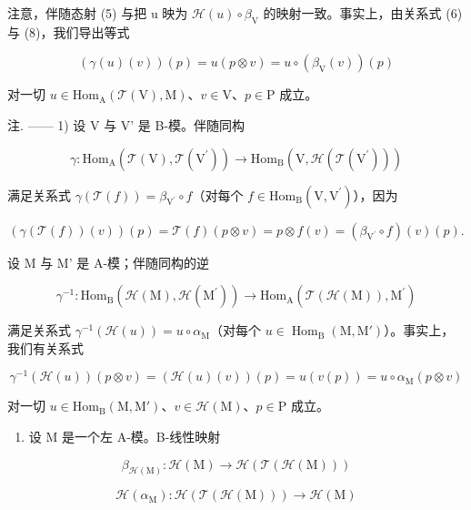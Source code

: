 注意，伴随态射 (5) 与把 u 映为 \(\mathcal{H}(u)\circ\beta_{\mathrm{V}}\) 的映射一致。事实上，由关系式 (6) 与 (8)，我们导出等式

\[
(\gamma (u) (v)) (p) = u (p \otimes v) = u \circ (\beta_ {\mathrm{V}} (v)) (p)
\]

对一切 \(u \in \mathrm{Hom}_{\mathrm{A}}(\mathcal{T}(\mathrm{V}), \mathrm{M})\)、\(v \in \mathrm{V}\)、\(p \in \mathrm{P}\) 成立。

注. —— 1) 设 V 与 V' 是 B-模。伴随同构

\[
\gamma : \mathrm{Hom} _ {\mathrm{A}} (\mathcal {T} (\mathrm{V}), \mathcal {T} (\mathrm{V} ^ {\prime})) \longrightarrow \mathrm{Hom} _ {\mathrm{B}} (\mathrm{V}, \mathcal {H} (\mathcal {T} (\mathrm{V} ^ {\prime})))
\]

满足关系式 \(\gamma (\mathcal{T}(f)) = \beta_{\mathrm{V}^{\prime}}\circ f\)（对每个 \(f\in \mathrm{Hom}_{\mathrm{B}}(\mathrm{V},\mathrm{V}^{\prime})\)），因为

\[
(\gamma (\mathcal {T} (f)) (v)) (p) = \mathcal {T} (f) (p \otimes v) = p \otimes f (v) = (\beta_ {\mathrm{V} ^ {\prime}} \circ f) (v) (p).
\]

设 M 与 M' 是 A-模；伴随同构的逆

\[
\gamma^ {- 1}: \mathrm{Hom} _ {\mathrm{B}} (\mathcal {H} (\mathrm{M}), \mathcal {H} (\mathrm{M} ^ {\prime})) \longrightarrow \mathrm{Hom} _ {\mathrm{A}} (\mathcal {T} (\mathcal {H} (\mathrm{M})), \mathrm{M} ^ {\prime})
\]

满足关系式 \(\gamma^{-1}(\mathcal{H}(u)) = u \circ \alpha_{\mathrm{M}}\)（对每个 \(u \in \operatorname{Hom}_{\mathrm{B}}(\mathrm{M}, \mathrm{M}')\)）。事实上，我们有关系式

\[
\gamma^ {- 1} (\mathcal {H} (u)) (p \otimes v) = (\mathcal {H} (u) (v)) (p) = u (v (p)) = u \circ \alpha_ {\mathrm{M}} (p \otimes v)
\]

对一切 \(u \in \mathrm{Hom}_{\mathrm{B}}(\mathrm{M}, \mathrm{M}')\)、\(v \in \mathcal{H}(\mathrm{M})\)、\(p \in \mathrm{P}\) 成立。

\begin{enumerate}
\def\labelenumi{\arabic{enumi})}
\setcounter{enumi}{1}
\tightlist
\item
  设 \(\mathrm{M}\) 是一个左 A-模。B-线性映射
\end{enumerate}

\[
\beta_ {\mathcal {H} (\mathrm{M})}: \mathcal {H} (\mathrm{M}) \to \mathcal {H} (\mathcal {T} (\mathcal {H} (\mathrm{M})))
\]

\[
\mathcal {H} (\alpha_ {\mathrm{M}}): \mathcal {H} (\mathcal {T} (\mathcal {H} (\mathrm{M}))) \to \mathcal {H} (\mathrm{M})
\]

